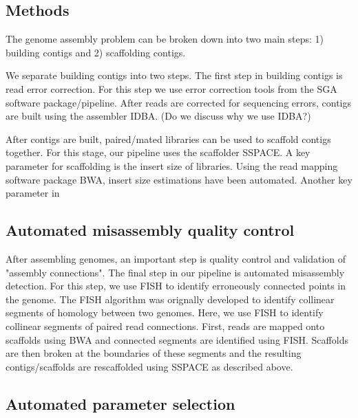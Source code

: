 \documentclass{bioinfo}
\begin{document}
\begin{methods}
\section{Methods}
The genome assembly problem can be broken down into two main steps: 1) building
contigs and 2) scaffolding contigs. 

We separate building contigs into two steps. The first step in building contigs
is read error correction. For this step we use error correction tools from the
SGA software package/pipeline. After reads are corrected for sequencing errors,
contigs are built using the assembler IDBA. (Do we discuss why we use IDBA?)  

After contigs are built, paired/mated libraries can be used to scaffold contigs 
together. For this stage, our pipeline uses the scaffolder SSPACE. A key 
parameter for scaffolding is the insert size of libraries. Using the read
mapping software package BWA, insert size estimations have been automated. Another
key parameter in 


\end{methods}

\subsection{Automated misassembly quality control}

After assembling genomes, an important step is quality control and validation
of "assembly connections". The final step in our pipeline is automated 
misassembly detection. For this step, we use FISH to identify erroneously
connected points in the genome. The FISH algorithm was orignally developed
to identify collinear segments of homology between two genomes. Here, we use
FISH to identify collinear segments of paired read connections. First, reads 
are mapped onto scaffolds using BWA and connected segments are identified using 
FISH. Scaffolds are then broken at the boundaries of these segments and the 
resulting contigs/scaffolds are rescaffolded using SSPACE as described above.


\subsection{Automated parameter selection}
\end{document}
